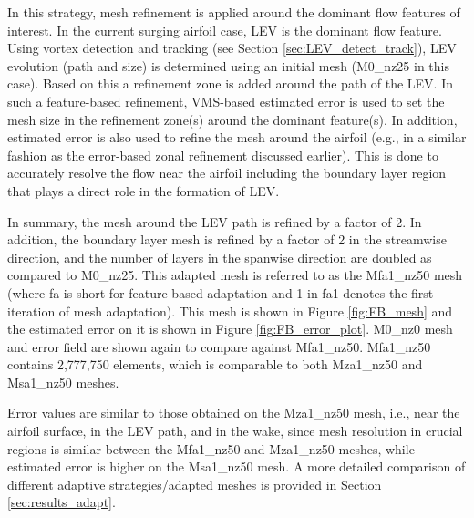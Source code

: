 In this strategy, mesh refinement is applied around the dominant flow features of interest.
In the current surging airfoil case, LEV is the dominant flow feature. 
Using vortex detection and tracking (see Section \ref{sec:LEV_detect_track}), LEV evolution (path and size) is determined using an initial mesh (M0\_nz25 in this case). 
Based on this a refinement zone is added around the path of the LEV.
In such a feature-based refinement, VMS-based estimated error is used to set the mesh size in the refinement zone(s) around the dominant feature(s). 
In addition, estimated error is also used to refine the mesh around the airfoil (e.g., in a similar fashion as the error-based zonal refinement discussed earlier). 
This is done to accurately resolve the flow near the airfoil including the boundary layer region that plays a direct role in the formation of LEV.

In summary, the mesh around the LEV path is refined by a factor of 2. In addition, the boundary layer mesh is refined by a factor of 2 in the streamwise direction, and the number of layers in the spanwise direction are doubled as compared to M0\_nz25.
This adapted mesh is referred to as the Mfa1\_nz50 mesh (where fa is short for feature-based adaptation and 1 in fa1 denotes the first iteration of mesh adaptation). 
This mesh is shown in Figure \ref{fig:FB_mesh} and the estimated error on it is shown in Figure \ref{fig:FB_error_plot}.
M0\_nz0 mesh and error field are shown again to compare against Mfa1\_nz50.
Mfa1\_nz50 contains 2,777,750 elements, which is comparable to both Mza1\_nz50 and Msa1\_nz50 meshes.

Error values are similar to those obtained on the Mza1\_nz50 mesh, i.e., near the airfoil surface, in the LEV path, and in the wake, since mesh resolution in crucial regions is similar between the Mfa1\_nz50 and Mza1\_nz50 meshes, while estimated error is higher on the Msa1\_nz50 mesh.
A more detailed comparison of different adaptive strategies/adapted meshes is provided in Section \ref{sec:results_adapt}.

